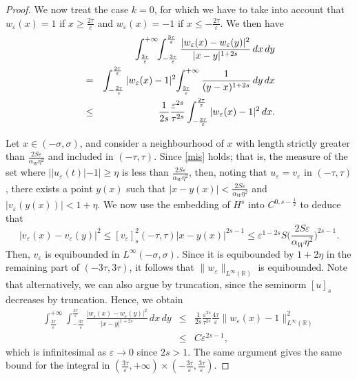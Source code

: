 \documentclass{article}
\newcommand{\e}{\varepsilon}
\begin{document}
\begin{proof}
\smallskip
We now treat the case $k=0$, for which we have to take into account that $w_\e(x)=1$ if $x\ge \frac{2\tau}{\e}$ and $w_\e(x)=-1$ if $x\le -\frac{2\tau}{\e}$.
We then have
\begin{eqnarray*}
&&\hskip-2cm\int_{\frac{3\tau}{\e}}^{+\infty}\!\!\int_{-\frac{3\tau}{\e}}^{\frac{3\tau}{\e}} \frac{|w_\e(x)-w_\e(y)|^2}{|x-y|^{1+2s}}\, dx\, dy\\&=&\int_{-\frac{2\tau}{\e}}^{\frac{2\tau}{\e}} |w_\e(x)-1|^2 \!\int_{\frac{3\tau}{\e}}^{+\infty}\frac{1}{(y-x)^{1+2s}}\, dy\, dx\\
&\leq&\frac{1}{2s} \frac{\e^{2s}}{\tau^{2s}}\int_{-\frac{2\tau}{\e}}^{\frac{2\tau}{\e}} |w_\e(x)-1|^2 %
\, dx.
\end{eqnarray*}

Let $x\in (-\sigma, \sigma)$, and consider a neighbourhood of $x$ with length strictly greater than 
$\frac{2S\e }{\alpha_W\eta^2}$ and included in $(-\tau,\tau)$. 
Since \eqref{mis} holds; that is, the measure of the set where
$||u_\e(t)|-1|\geq \eta$ is less than $\frac{2S\e}{\alpha_W\eta^2}$, then, noting that 
$u_\e=v_\e$ in $(-\tau,\tau)$, there exists a point $y(x)$ such that $|x-y(x)|<\frac{2S\e }{\alpha_W\eta^2}$ and $|v_\e(y(x))|<1+\eta$. We now use the embedding of $H^s$ into $C^{0,s-\frac12}$ to deduce that 
\begin{equation}
|v_\e(x)-v_\e(y)|^2\leq [v_\e]^2_s(-\tau,\tau) |x-y(x)|^{2s-1}\leq \e^{1-2s}S \Big(\frac{2S\e }{\alpha_W\eta^2}\Big)^{2s-1}. 
\end{equation}
Then, $v_\e$ is equibounded in $L^\infty(-\sigma,\sigma)$. Since it is equibounded by $1+2\eta$ in the remaining part of $(-3\tau,3\tau)$, it follows that $\|w_\e\|_{L^{\infty}(\mathbb R)}$ is equibounded. Note that alternatively, we can also argue by truncation, since the seminorm $[u]_s$ decreases by truncation.
Hence, we obtain 
\begin{eqnarray*}
\int_{\frac{3\tau}{\e}}^{+\infty}\!\!\int_{-\frac{3\tau}{\e}}^{\frac{3\tau}{\e}} \frac{|w_\e(x)-w_\e(y)|^2}{|x-y|^{1+2s}}\, dx\, dy
&\leq&\frac{1}{2s} \frac{\e^{2s}}{\tau^{2s}}\frac{4\tau}{\e} \|w_\e(x)-1\|_{L^\infty(\mathbb R)}^2 \\
&\leq& C\e^{2s-1}, 
\end{eqnarray*}
which is infinitesimal as $\e\to 0$ since $2s>1$. 
The same argument gives the same bound for the integral in $(\frac{3\tau}{\e},+\infty)\times (-\frac{3\tau}{\e},\frac{3\tau}{\e})$. 


\end{proof}
\end{document}
